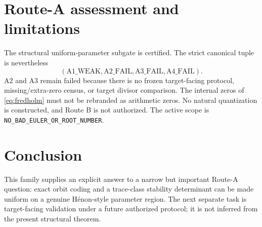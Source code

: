 \documentclass[11pt]{article}
\begin{document}
\section{Route-A assessment and limitations}

The structural uniform-parameter subgate is certified.  The strict canonical
tuple is nevertheless
\[
 (\mathrm{A1\_WEAK},\mathrm{A2\_FAIL},
  \mathrm{A3\_FAIL},\mathrm{A4\_FAIL}).
\]
A2 and A3 remain failed because there is no frozen target-facing protocol,
missing/extra-zero census, or target divisor comparison.  The internal zeros
of \eqref{eq:fredholm} must not be rebranded as arithmetic zeros.  No natural
quantization is constructed, and Route B is not authorized.  The active scope
is \texttt{NO\_BAD\_EULER\_OR\_ROOT\_NUMBER}.

\section{Conclusion}

This family supplies an explicit answer to a narrow but important Route-A
question: exact orbit coding and a trace-class stability determinant can be
made uniform on a genuine H\'enon-style parameter region.  The next separate
task is target-facing validation under a future authorized protocol; it is
not inferred from the present structural theorem.
\end{document}
